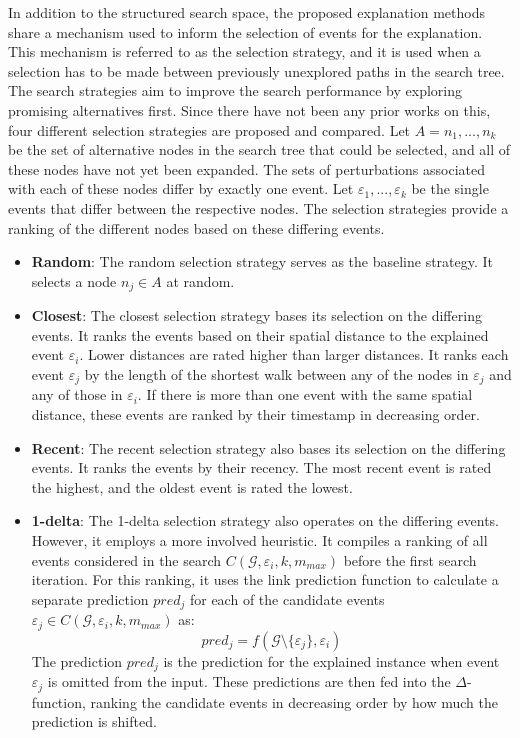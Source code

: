 In addition to the structured search space, the proposed explanation methods share a mechanism used to inform the selection of events for the explanation. This mechanism is referred to as the selection strategy, and it is used when a selection has to be made between previously unexplored paths in the search tree. The search strategies aim to improve the search performance by exploring promising alternatives first. Since there have not been any prior works on this, four different selection strategies are proposed and compared. Let $A = {n_1,...,n_k}$ be the set of alternative nodes in the search tree that could be selected, and all of these nodes have not yet been expanded. The sets of perturbations associated with each of these nodes differ by exactly one event. Let $\varepsilon_1, ..., \varepsilon_k$ be the single events that differ between the respective nodes. The selection strategies provide a ranking of the different nodes based on these differing events.

\begin{itemize}
    \item \textbf{Random}: The random selection strategy serves as the baseline strategy. It selects a node $n_j \in A$ at random.
    \item \textbf{Closest}: The closest selection strategy bases its selection on the differing events. It ranks the events based on their spatial distance to the explained event $\varepsilon_i$. Lower distances are rated higher than larger distances. It ranks each event $\varepsilon_j$ by the length of the shortest walk between any of the nodes in $\varepsilon_j$ and any of those in $\varepsilon_i$. If there is more than one event with the same spatial distance, these events are ranked by their timestamp in decreasing order.
    \item \textbf{Recent}: The recent selection strategy also bases its selection on the differing events. It ranks the events by their recency. The most recent event is rated the highest, and the oldest event is rated the lowest.
    \item \textbf{1-delta}: The 1-delta selection strategy also operates on the differing events. However, it employs a more involved heuristic. It compiles a ranking of all events considered in the search $C(\mathcal{G}, \varepsilon_i, k, m_{max})$ before the first search iteration. For this ranking, it uses the link prediction function to calculate a separate prediction $pred_j$ for each of the candidate events $\varepsilon_j \in C(\mathcal{G}, \varepsilon_i, k, m_{max})$ as:
    \begin{equation}
        pred_j = f(\mathcal{G} \setminus \{\varepsilon_j\}, \varepsilon_i)
    \end{equation}
    The prediction $pred_j$ is the prediction for the explained instance when event $\varepsilon_j$ is omitted from the input. These predictions are then fed into the $\Delta$-function, ranking the candidate events in decreasing order by how much the prediction is shifted.
\end{itemize}

